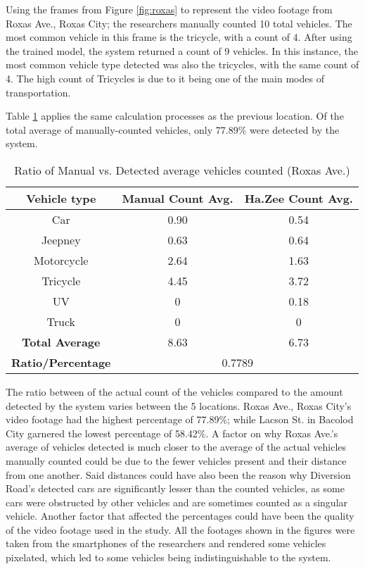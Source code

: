 Using the frames from Figure \ref{fig:roxas} to represent the video footage from  Roxas Ave., Roxas City; the researchers manually counted 10 total vehicles. The most common vehicle in this frame is the tricycle, with a count of 4. After using the trained model, the system returned a count of 9 vehicles. In this instance, the most common vehicle type detected was also the tricycles, with the same count of 4. The high count of Tricycles is due to it being one of the main modes of transportation.

Table \ref{tab:roxas_ave} applies the same calculation processes as the previous location. Of the total average of manually-counted vehicles, only 77.89\% were detected by the system. 



\begin{table}[ht]   %
	\centering
	\caption{Ratio of Manual vs. Detected average vehicles counted  (Roxas Ave.)} \vspace{0.25em}
	\begin{tabular}{c|c|c} \hline
		\centering \textbf {Vehicle type} & \textbf{Manual Count Avg.} & \textbf{Ha.Zee Count Avg.} \\ \hline
		Car & 0.90 & 0.54   \\ \hline
		Jeepney & 0.63 & 0.64  	\\ \hline
		Motorcycle& 2.64  & 1.63  \\ \hline
		Tricycle   & 4.45  & 3.72 \\ \hline
		UV & 0 & 0.18  \\ \hline
		Truck & 0 & 0 \\ \hline
		
		\textbf{Total Average} & 8.63 & 6.73 \\ \hline
		\textbf{Ratio/Percentage} & \multicolumn{2}{c}{0.7789}  \\ \hline
		
		
	\end{tabular}
	\label{tab:roxas_ave}
\end{table}

The ratio between of the actual count of the vehicles compared to the amount detected by the system varies between the 5 locations. Roxas Ave., Roxas City’s video footage had the highest percentage of 77.89\%; while Lacson St. in Bacolod City garnered the lowest percentage of 58.42\%. A factor on why Roxas Ave.’s average of vehicles detected is much closer to the average of the actual vehicles manually counted could be due to the fewer vehicles present and their distance from one another. Said distances could have also been the reason why Diversion Road’s detected cars are significantly lesser than the counted vehicles, as some cars were obstructed by other vehicles and are sometimes counted as a singular vehicle. Another factor that affected the percentages could have been the quality of the video footage used in the study. All the footages shown in the figures were taken from the smartphones of the researchers and rendered some vehicles pixelated, which led to some vehicles being indistinguishable to the system. 



